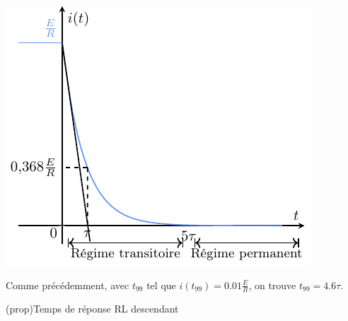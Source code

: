 \documentclass[../../main/main.tex]{subfiles}
\begin{document}
\begin{tcb*}[label=impl:déterm, sidebyside, righthand ratio=.4]
{		\includegraphics[width=\linewidth]{carac_rl-tau_decharge}
	}%
\end{tcb*}
Comme précédemment, avec $t_{99}$ tel que $i(t_{99}) = \num{0.01}\frac{E}{R}$,
on trouve $t_{99} = \num{4.6}\tau$.
\begin{tcb*}(prop){Temps de réponse RL descendant}
	{}
\end{tcb*}
\end{document}
